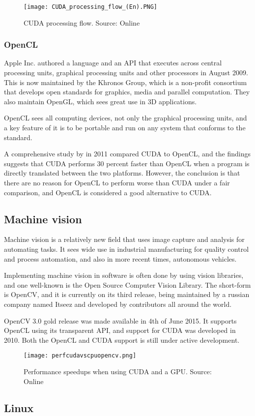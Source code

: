 \begin{figure}[ht]
    \centering
    \texttt{[image: CUDA\_processing\_flow\_(En).PNG]}
    \caption{CUDA processing flow. Source: Online \citet{wikicuda15}}
    \label{fig:cfs_simple_new}
\end{figure}
\FloatBarrier

\subsubsection{OpenCL}
Apple Inc. authored a language and an API that executes across central processing units, graphical processing units and other processors in August 2009. This is now maintained by the Khronos Group, which is a non-profit consortium that develops open standards for graphics, media and parallel computation. They also maintain OpenGL, which sees great use in 3D applications.

OpenCL sees all computing devices, not only the graphical processing units, and a key feature of it is to be portable and run on any system that conforms to the standard.

A comprehensive study by \citep{fang11} in 2011 compared CUDA to OpenCL, and the findings suggests that CUDA performs 30 percent faster than OpenCL when a program is directly translated between the two platforms. However, the conclusion is that there are no reason for OpenCL to perform worse than CUDA under a fair comparison, and OpenCL is considered a good alternative to CUDA.

\subsection{Machine vision}
Machine vision is a relatively new field that uses image capture and analysis for automating tasks. It sees wide use in industrial manufacturing for quality control and process automation, and also in more recent times, autonomous vehicles.

Implementing machine vision in software is often done by using vision libraries, and one well-known is the Open Source Computer Vision Library. The short-form is OpenCV, and it is currently on its third release, being maintained by a russian company named Itseez and developed by contributors all around the world.

OpenCV 3.0 gold release was made available in 4th of June 2015. It supports OpenCL using its transparent API, and support for CUDA was developed in 2010. Both the OpenCL and CUDA support is still under active development.

\begin{figure}[ht]
    \centering
    \texttt{[image: perfcudavscpuopencv.png]}
    \caption{Performance speedups when using CUDA and a GPU. Source: Online \citet{opencvcuda15}}
    \label{fig:cfs_simple_new}
\end{figure}
\FloatBarrier


\subsection{Linux}